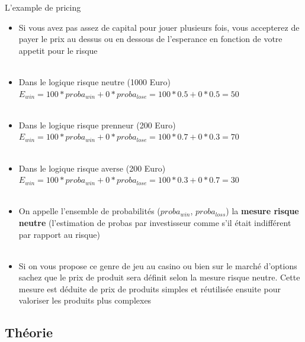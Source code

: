 \documentclass[10pt]{beamer}
\begin{document}
\begin{frame}{L'example de pricing}{}
\begin{block}{}

\scriptsize{  \begin{itemize}
        \item Si vous avez pas assez de capital pour jouer plusieurs fois, vous accepterez de payer le prix au dessus ou en dessous de l'esperance en fonction de votre appetit pour le risque \\~\\
        \item Dans le logique risque neutre (1000 Euro) $ E_{win} = 100*proba_{win} + 0*proba_{lose} = 100*0.5 + 0*0.5 = 50 $ \\~\\
        \item Dans le logique risque prenneur (200 Euro) $ E_{win} = 100*proba_{win} + 0*proba_{lose} = 100*0.7 + 0*0.3 = 70 $  \\~\\ 
        \item Dans le logique risque averse (200 Euro) $ E_{win} = 100*proba_{win} + 0*proba_{lose} = 100*0.3 + 0*0.7 = 30 $  \\~\\
        \item On appelle l'ensemble de probabilités ($proba_{win}$, $proba_{loss}$) la \textbf{mesure risque neutre} (l'estimation de probas par investisseur comme s'il était indifférent par rapport au risque) \\~\\
        
        \item Si on vous propose ce genre de jeu au casino ou bien sur le marché d'options sachez que le prix de produit sera définit selon la mesure risque neutre. Cette mesure est déduite de prix de produits simples et réutilisée ensuite pour valoriser les produits plus complexes
        
   \end{itemize}
    
    }
\end{block}
\end{frame}

\subsection{Théorie}
\end{document}
